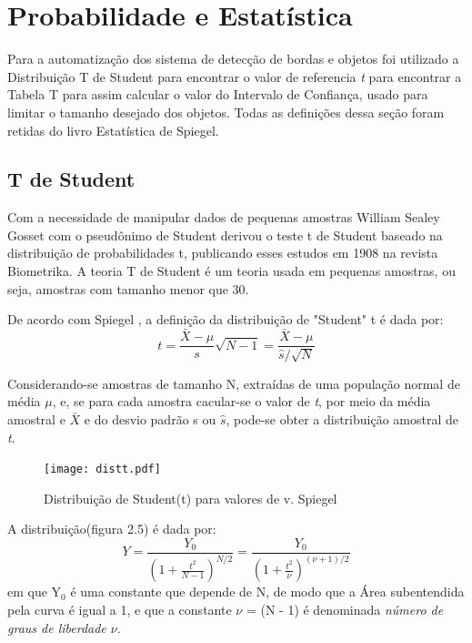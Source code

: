 \section{Probabilidade e Estatística}

Para a automatização dos sistema de detecção de bordas e objetos foi utilizado a Distribuição T de Student para encontrar o valor de referencia \textit{t} para encontrar a Tabela T\cite{TabelaUFF} para assim calcular o valor do Intervalo de Confiança, usado para limitar o tamanho desejado dos objetos.
Todas as definições dessa seção foram retidas do livro Estatística de Spiegel\cite{Spiegel:1974}. 
\subsection{T de Student}
Com a necessidade de manipular dados de pequenas amostras William Sealey Gosset com o pseudônimo de Student derivou o teste t de Student baseado na distribuição de probabilidades t, publicando esses estudos em 1908 na revista Biometrika\cite{UFRN}.
A teoria T de Student é um teoria usada em pequenas amostras, ou seja, amostras com tamanho menor que 30.

De acordo com Spiegel \cite{Spiegel:1974}, a definição da distribuição de "Student" t é dada por:
\begin{displaymath} 
\textit{t}= \frac{\bar{X} - \mu }{\textit{s}} \sqrt{N - 1} = \frac{\bar{X} - \mu}{  \hat{s} / \sqrt{N} }
\end{displaymath}

Considerando-se amostras de tamanho N, extraídas de uma população normal de média  $\mu$, e, se para cada amostra cacular-se o valor de \textit{t}, por meio da média amostral e $\bar{X}$ e do desvio padrão s ou $\hat{s}$, pode-se obter a distribuição amostral de \textit{t}.
\begin{figure}[!h]
	\centering
	\texttt{[image: distt.pdf]}
	\caption{Distribuição de Student(t) para valores de v.  Spiegel \cite{Spiegel:1974}}
	\label{DistribuicaoTparV}
\end{figure}

\newpage
A distribuição(figura 2.5) é dada por:
\begin{displaymath}
Y=\frac{Y_{0}}{\left ( 1 + \frac{\mathit{t}^{2}}{N-1} \right ) ^{N/2}} = \frac{Y_{0}}{\left ( 1 + \frac{\mathit{t}^{2}}{\nu} \right ) ^{\left (\nu+1  \right )/2}}
\end{displaymath}
em que Y$_0$ é uma constante que depende de N, de modo que a Área subentendida pela curva é igual a 1, e que a constante  $\nu$ = (N - 1) é denominada \textit{número de graus de liberdade $\nu$}.
